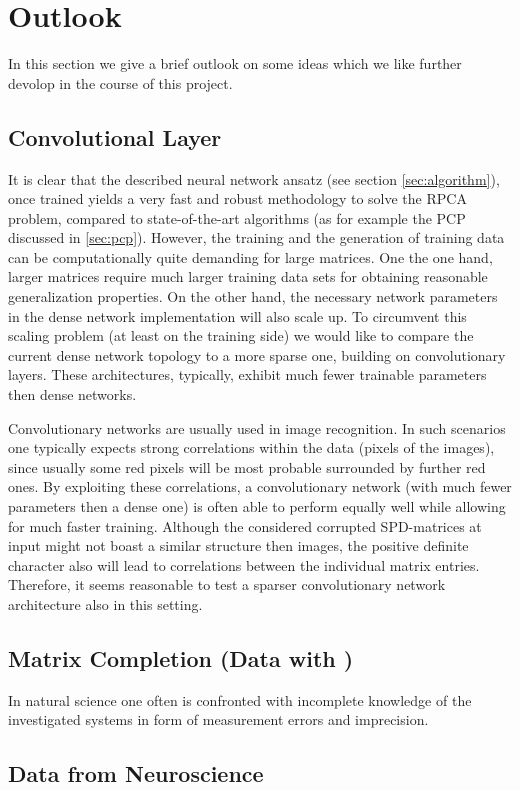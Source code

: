 \newpage
\section{Outlook}\label{sec:outlook}

In this section we give a brief outlook on some ideas which we like further devolop in the course of this project.


\subsection{Convolutional Layer}
It is clear that the described neural network ansatz (see section \ref{sec:algorithm}), once trained yields a very fast and robust methodology to solve the RPCA problem, compared to state-of-the-art algorithms (as for example the PCP discussed in \ref{sec:pcp}). However, the training and the generation of training data can be computationally quite demanding for large matrices. One the one hand, larger matrices require much larger training data sets for obtaining reasonable generalization properties. On the other hand, the necessary network parameters in the dense network implementation will also scale up. To circumvent this scaling problem (at least on the training side) we would like to compare the current dense network topology to a more sparse one, building on convolutionary layers. These architectures, typically, exhibit much fewer trainable parameters then dense networks.

Convolutionary networks are usually used in image recognition. In such scenarios one typically expects strong correlations within the data (pixels of the images), since usually some red pixels will be most probable surrounded by further red ones. By exploiting these correlations, a convolutionary network (with much fewer parameters then a dense one) is often able to perform equally well while allowing for much faster training. Although the considered corrupted SPD-matrices at input might not boast a similar structure then images, the positive definite character also will lead to correlations between the individual matrix entries. Therefore, it seems reasonable to test a sparser convolutionary network architecture also in this setting.



\subsection{Matrix Completion (Data with )}
In natural science one often is confronted with incomplete knowledge of the investigated systems in form of measurement errors and imprecision.

\subsection{Data from Neuroscience}

